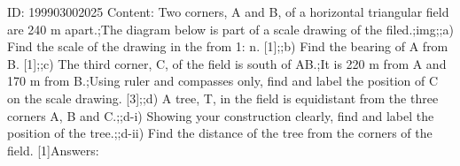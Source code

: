 \documentclass{article}
\begin{document}
ID: 199903002025
Content:
Two corners, A and B, of a horizontal triangular field are 240 m apart.;The diagram below is part of a scale drawing of the filed.;img;;a) Find the scale of the drawing in the from 1: n. [1];;b) Find the bearing of A from B. [1];;c) The third corner, C, of the field is south of AB.;It is 220 m from A and 170 m from B.;Using ruler and compasses only, find and label the position of C on the scale drawing.   [3];;d) A tree, T, in the field is equidistant from the three corners A, B and C.;;d-i) Showing your construction clearly, find and label the position of the tree.;;d-ii) Find the distance of the tree from the corners of the field.   [1]Answers:
\end{document}
